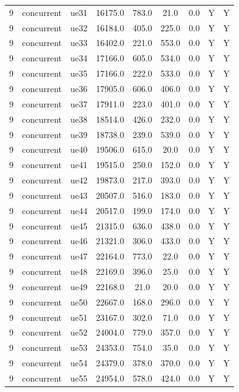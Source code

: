 \begin{table}[ht]
\begin{tabular}{|c|c|c|c|c|c|c|c|c|}
9 & concurrent & ue31 & 16175.0 & 783.0 & 21.0 & 0.0 & Y & Y \\
9 & concurrent & ue32 & 16184.0 & 405.0 & 225.0 & 0.0 & Y & Y \\
9 & concurrent & ue33 & 16402.0 & 221.0 & 553.0 & 0.0 & Y & Y \\
9 & concurrent & ue34 & 17166.0 & 605.0 & 534.0 & 0.0 & Y & Y \\
9 & concurrent & ue35 & 17166.0 & 222.0 & 533.0 & 0.0 & Y & Y \\
9 & concurrent & ue36 & 17905.0 & 606.0 & 406.0 & 0.0 & Y & Y \\
9 & concurrent & ue37 & 17911.0 & 223.0 & 401.0 & 0.0 & Y & Y \\
9 & concurrent & ue38 & 18514.0 & 426.0 & 232.0 & 0.0 & Y & Y \\
9 & concurrent & ue39 & 18738.0 & 239.0 & 539.0 & 0.0 & Y & Y \\
9 & concurrent & ue40 & 19506.0 & 615.0 & 20.0 & 0.0 & Y & Y \\
9 & concurrent & ue41 & 19515.0 & 250.0 & 152.0 & 0.0 & Y & Y \\
9 & concurrent & ue42 & 19873.0 & 217.0 & 393.0 & 0.0 & Y & Y \\
9 & concurrent & ue43 & 20507.0 & 516.0 & 183.0 & 0.0 & Y & Y \\
9 & concurrent & ue44 & 20517.0 & 199.0 & 174.0 & 0.0 & Y & Y \\
9 & concurrent & ue45 & 21315.0 & 636.0 & 438.0 & 0.0 & Y & Y \\
9 & concurrent & ue46 & 21321.0 & 306.0 & 433.0 & 0.0 & Y & Y \\
9 & concurrent & ue47 & 22164.0 & 773.0 & 22.0 & 0.0 & Y & Y \\
9 & concurrent & ue48 & 22169.0 & 396.0 & 25.0 & 0.0 & Y & Y \\
9 & concurrent & ue49 & 22168.0 & 21.0 & 20.0 & 0.0 & Y & Y \\
9 & concurrent & ue50 & 22667.0 & 168.0 & 296.0 & 0.0 & Y & Y \\
9 & concurrent & ue51 & 23167.0 & 302.0 & 71.0 & 0.0 & Y & Y \\
9 & concurrent & ue52 & 24004.0 & 779.0 & 357.0 & 0.0 & Y & Y \\
9 & concurrent & ue53 & 24353.0 & 754.0 & 35.0 & 0.0 & Y & Y \\
9 & concurrent & ue54 & 24379.0 & 378.0 & 370.0 & 0.0 & Y & Y \\
9 & concurrent & ue55 & 24954.0 & 578.0 & 424.0 & 0.0 & Y & Y \\

\end{tabular}
\end{table}
